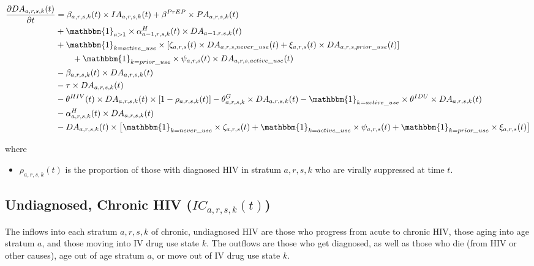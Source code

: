 \documentclass{article}
\begin{document}
\begin{align*}
\frac{\partial DA_{a,r,s,k}(t)}{\partial t} 
&= \beta_{a,r,s,k}(t) \times IA_{a,r,s,k}(t) + \beta^{PrEP} \times PA_{a,r,s,k}(t) \\
&+ \mathbbm{1}_{a>1} \times \alpha_{a-1,r,s,k}^H(t) \times DA_{a-1,r,s,k}(t) \\
&+ \mathbbm{1}_{k=active\_use} \times [\zeta_{a,r,s}(t) \times DA_{a,r,s,never\_use}(t) + \xi_{a,r,s}(t) \times DA_{a,r,s,prior\_use}(t)]\\
&\qquad + \mathbbm{1}_{k=prior\_use} \times \psi_{a,r,s}(t) \times DA_{a,r,s,active\_use}(t)\\
&- \beta_{a,r,s,k}(t) \times DA_{a,r,s,k}(t) \\
&- \tau \times DA_{a,r,s,k}(t) \\
&- \theta^{HIV}(t) \times DA_{a,r,s,k}(t) \times [1-\rho_{a,r,s,k}(t)]
- \theta^G_{a,r,s,k} \times DA_{a,r,s,k}(t) 
- \mathbbm{1}_{k=active\_use} \times \theta^{IDU} \times DA_{a,r,s,k}(t) \\
&- \alpha_{a,r,s,k}^H(t) \times DA_{a,r,s,k}(t) \\
&- DA_{a,r,s,k}(t) \times \big[\mathbbm{1}_{k=never\_use} \times \zeta_{a,r,s}(t) + \mathbbm{1}_{k=active\_use} \times \psi_{a,r,s}(t) + \mathbbm{1}_{k=prior\_use} \times \xi_{a,r,s}(t)\big]
\end{align*}

where
\begin{itemize}
	\item $\rho_{a,r,s,k}(t)$ is the proportion of those with diagnosed HIV in stratum $a,r,s,k$ who are virally suppressed at time $t$.
\end{itemize}

\subsection{Undiagnosed, Chronic HIV \big($IC_{a,r,s,k}(t)$\big)}

The inflows into each stratum $a,r,s,k$ of chronic, undiagnosed HIV are those who progress from acute to chronic HIV, those aging into age stratum $a$, and those moving into IV drug use state $k$. The outflows are those who get diagnosed, as well as those who die (from HIV or other causes), age out of age stratum $a$, or move out of IV drug use state $k$.
\end{document}
